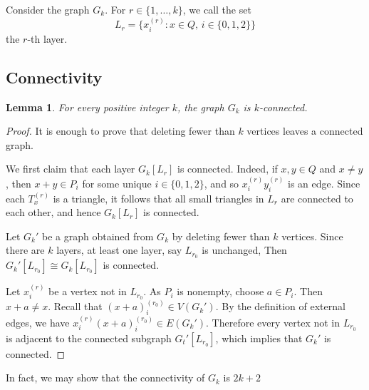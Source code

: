 \documentclass[12pt]{article}
\newtheorem{lemma}{Lemma}
\begin{document}
Consider the graph  $G_k$.
For $r\in\{1,\ldots,k\}$, we call the set
\[
L_r=\{x_i^{(r)}:x\in Q,\, i\in\{0,1,2\}\}
\]
the $r$-th layer. 


\subsection{Connectivity}\label{sec:connectivity}

\begin{lemma}\label{lem:connectivity}
For every positive integer $k$, the graph $G_k$ is $k$-connected.
\end{lemma}

\begin{proof}
It is enough to prove that deleting fewer than $k$ vertices leaves a connected graph.

We first claim that each layer $G_k[L_r]$ is connected. Indeed, if $x,y\in Q$ and $x\ne y$, then $x+y\in P_i$ for some unique $i\in\{0,1,2\}$, and so $x_i^{(r)}y_i^{(r)}$ is an edge. Since each $T_x^{(r)}$ is a triangle, it follows that all small triangles in $L_r$ are connected to each other, and hence $G_k[L_r]$ is connected.

Let $G_k'$ be a graph obtained from $G_k$ by deleting fewer than $k$ vertices. Since there are $k$ layers, at least one layer, say $L_{r_0}$ is unchanged,  Then  $G_k'[L_{r_0}]\cong G_k[L_{r_0}]$ is connected.

Let $x_i^{(r)}$ be a vertex not in $L_{r_0}$. As $P_i$ is nonempty, choose $a\in P_i$. Then $x+a\ne x$. Recall that $(x+a)_i^{(r_0)}\in V(G_k')$. By the definition of external edges, we have $x_i^{(r)}(x+a)_i^{(r_0)}\in E(G_k')$.
Therefore every vertex not in $L_{r_0}$ is adjacent to the connected subgraph $G_t'[L_{r_0}]$, which implies that $G_k'$ is connected. 
\end{proof}

In fact, we may show that the connectivity of $G_k$ is $2k+2$
\end{document}
